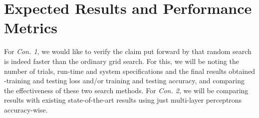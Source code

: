 \documentclass{article}
\begin{document}
\section{Expected Results and Performance Metrics}
For \emph{Con. 1}, we would like to verify the claim put forward by \citet{random-search} that random search is indeed faster than the ordinary grid search. For this, we will be noting the number of trials, run-time and system specifications and the final results obtained -training and testing loss and/or training and testing accuracy, and comparing the effectiveness of these two search methods. For \emph{Con. 2}, we will be comparing results with existing state-of-the-art results using just multi-layer perceptrons accuracy-wise.


\end{document}
